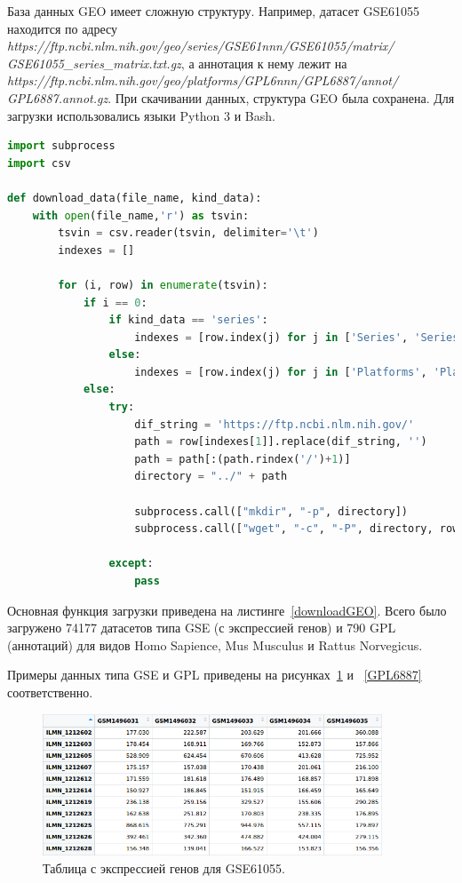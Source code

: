 \documentclass[times,specification,annotation]{itmo-student-thesis}
\begin{document}
База данных GEO имеет сложную структуру. Например, датасет GSE61055 находится по адресу \textit{https://ftp.ncbi.nlm.nih.gov/geo/series/GSE61nnn/GSE61055/matrix/} \textit{GSE61055\_series\_matrix.txt.gz}, а аннотация к нему лежит на \textit{https://ftp.ncbi.nlm.nih.gov/geo/platforms/GPL6nnn/GPL6887/annot/} \textit{GPL6887.annot.gz}. При скачивании данных, структура GEO была сохранена. Для загрузки использовались языки Python 3 и Bash. 

\begin{lstlisting}[float=!h, caption={Загрузка данных из GEO.}, captionpos=b, label={downloadGEO}, basicstyle=\footnotesize, language=Python]
import subprocess
import csv

def download_data(file_name, kind_data): 
    with open(file_name,'r') as tsvin:
        tsvin = csv.reader(tsvin, delimiter='\t')
        indexes = []
        
        for (i, row) in enumerate(tsvin):
            if i == 0:
                if kind_data == 'series':
                    indexes = [row.index(j) for j in ['Series', 'Series_url']]
                else:
                    indexes = [row.index(j) for j in ['Platforms', 'Platforms_url']]
            else:    
                try:
                    dif_string = 'https://ftp.ncbi.nlm.nih.gov/'
                    path = row[indexes[1]].replace(dif_string, '')
                    path = path[:(path.rindex('/')+1)]
                    directory = "../" + path

                    subprocess.call(["mkdir", "-p", directory])
                    subprocess.call(["wget", "-c", "-P", directory, row[indexes[1]]])

                except:
                    pass

\end{lstlisting}


Основная функция загрузки приведена на листинге~\ref{downloadGEO}. Всего было загружено 74177 датасетов типа GSE (с экспрессией генов) и 790 GPL (аннотаций) для видов Homo Sapience, Mus Musculus и Rattus Norvegicus. 

Примеры данных типа GSE и GPL приведены на рисунках~\ref{GSE61055} и ~\ref{GPL6887} соответственно. 

\begin{figure}[!h]
    \caption{Таблица с экспрессией генов для GSE61055.}\label{GSE61055}
    \centering
    \includegraphics[width=0.9\textwidth]{GSE61055.png}
\end{figure}  
\end{document}
